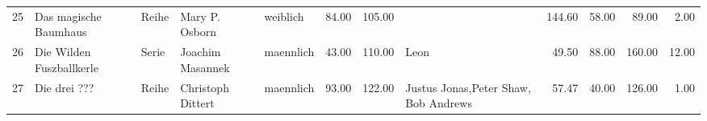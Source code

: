 \begin{table}
\begin{center}
{\begin{tabular}{rllllrrlrrrr}
  25 & Das magische Baumhaus                                                                                                                                                                                                                                           & Reihe & Mary P. Osborn                                                                                                                                                                                                                                                  & weiblich & 84.00 & 105.00 &                                                                                                                                                                                                                                                                 & 144.60 & 58.00 & 89.00 & 2.00 \\ 
  26 & Die Wilden Fuszballkerle                                                                                                                                                                                                                                        & Serie & Joachim Masannek                                                                                                                                                                                                                                                & maennlich & 43.00 & 110.00 & Leon                                                                                                                                                                                                                                                            & 49.50 & 88.00 & 160.00 & 12.00 \\ 
  27 & Die drei ???                                                                                                                                                                                                                                                    & Reihe & Christoph Dittert                                                                                                                                                                                                                                               & maennlich & 93.00 & 122.00 & Justus Jonas,Peter Shaw, Bob Andrews                                                                                                                                                                                                                            & 57.47 & 40.00 & 126.00 & 1.00 \\ 

\end{tabular}}
\end{center}
\end{table}

